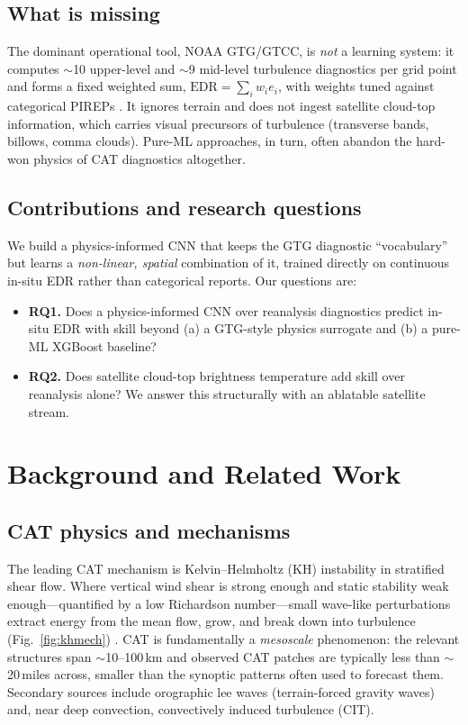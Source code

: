\documentclass[11pt]{article}
\begin{document}
\subsection{What is missing}
The dominant operational tool, NOAA GTG/GTCC, is \emph{not} a learning
system: it computes $\sim$10 upper-level and $\sim$9 mid-level turbulence
diagnostics per grid point and forms a fixed weighted sum,
$\mathrm{EDR}=\sum_i w_i e_i$, with weights tuned against categorical
PIREPs \citep{sharman2006gtg}. It ignores terrain and does not ingest
satellite cloud-top information, which carries visual precursors of
turbulence (transverse bands, billows, comma clouds). Pure-ML
approaches, in turn, often abandon the hard-won physics of CAT
diagnostics altogether.

\subsection{Contributions and research questions}
We build a physics-informed CNN that keeps the GTG diagnostic
``vocabulary'' but learns a \emph{non-linear, spatial} combination of
it, trained directly on continuous in-situ EDR rather than categorical
reports. Our questions are:
\begin{itemize}
  \item \textbf{RQ1.} Does a physics-informed CNN over reanalysis
  diagnostics predict in-situ EDR with skill beyond (a) a GTG-style
  physics surrogate and (b) a pure-ML XGBoost baseline?
  \item \textbf{RQ2.} Does satellite cloud-top brightness temperature
  add skill over reanalysis alone? We answer this structurally with an
  ablatable satellite stream.
\end{itemize}

\section{Background and Related Work}
\label{sec:background}

\subsection{CAT physics and mechanisms}
The leading CAT mechanism is Kelvin--Helmholtz (KH) instability in
stratified shear flow. Where vertical wind shear is strong enough and
static stability weak enough---quantified by a low Richardson
number---small wave-like perturbations extract energy from the mean
flow, grow, and break down into turbulence
(Fig.~\ref{fig:khmech}) \citep{williamsjoshi}. CAT is fundamentally a
\emph{mesoscale} phenomenon: the relevant structures span
$\sim$10--100\,km and observed CAT patches are typically less than
$\sim$20\,miles across, smaller than the synoptic patterns often used to
forecast them. Secondary sources include orographic lee waves
(terrain-forced gravity waves) and, near deep convection, convectively
induced turbulence (CIT).
\end{document}
